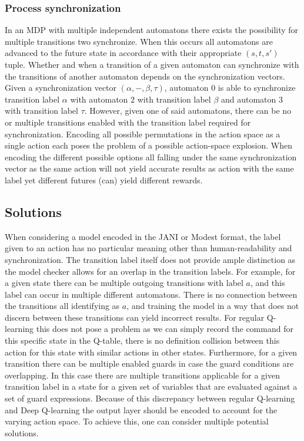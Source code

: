 \subsubsection{Process synchronization}
In an MDP with multiple independent automatons there exists the possibility for multiple transitions two synchronize. When this occurs all automatons are advanced to the future state in accordance with their appropriate $(s, t, s')$ tuple. Whether and when a transition of a given automaton can synchronize with the transitions of another automaton depends on the synchronization vectors. Given a synchronization vector $(\alpha, -, \beta, \tau)$, automaton $0$ is able to synchronize transition label $\alpha$ with automaton $2$ with transition label $\beta$ and automaton $3$ with transition label $\tau$. However, given one of said automatons, there can be no or multiple transitions enabled with the transition label required for synchronization. Encoding all possible permutations in the action space as a single action each poses the problem of a possible action-space explosion. When encoding the different possible options all falling under the same synchronization vector as the same action will not yield accurate results as action with the same label yet different futures (can) yield different rewards.

\subsection{Solutions}
When considering a model encoded in the JANI \cite{jani} or Modest \cite{modest} format, the label given to an action has no particular meaning other than human-readability and synchronization. The transition label itself does not provide ample distinction as the model checker allows for an overlap in the transition labels. For example, for a given state there can be multiple outgoing transitions with label $a$, and this label can occur in multiple different automatons. There is no connection between the transitions all identifying as $a$, and training the model in a way that does not discern between these transitions can yield incorrect results. For regular Q-learning this does not pose a problem as we can simply record the command for this specific state in the Q-table, there is no definition collision between this action for this state with similar actions in other states. Furthermore, for a given transition there can be multiple enabled guards in case the guard conditions are overlapping. In this case there are multiple transitions applicable for a given transition label in a state for a given set of variables that are evaluated against a set of guard expressions. Because of this discrepancy between regular Q-learning and Deep Q-learning the output layer should be encoded to account for the varying action space. To achieve this, one can consider multiple potential solutions.

